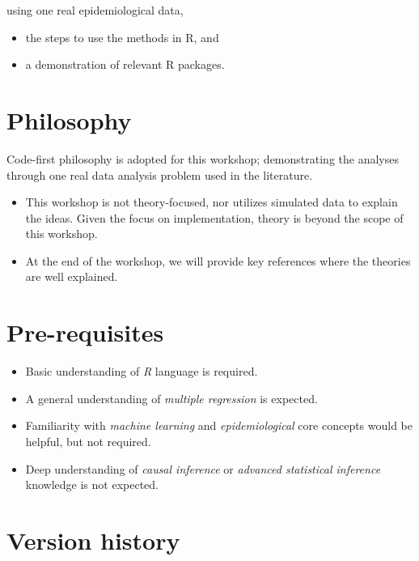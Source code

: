 \documentclass[
]{book}
\providecommand{\tightlist}{%
  \setlength{\itemsep}{0pt}\setlength{\parskip}{0pt}}
\begin{document}
using one real epidemiological data,

\begin{itemize}
\tightlist
\item
  the steps to use the methods in R, and
\item
  a demonstration of relevant R packages.~
\end{itemize}

\hypertarget{philosophy}{%
\section*{Philosophy}\label{philosophy}}

Code-first philosophy is adopted for this workshop; demonstrating the analyses through one real data analysis problem used in the literature.

\begin{itemize}
\tightlist
\item
  This workshop is not theory-focused, nor utilizes simulated data to explain the ideas. Given the focus on implementation, theory is beyond the scope of this workshop.
\item
  At the end of the workshop, we will provide key references where the theories are well explained.
\end{itemize}

\hypertarget{pre-requisites}{%
\section*{Pre-requisites}\label{pre-requisites}}

\begin{itemize}
\tightlist
\item
  Basic understanding of \emph{R} language is required.
\item
  A general understanding of \emph{multiple regression} is expected.
\item
  Familiarity with \emph{machine learning} and \emph{epidemiological} core concepts would be helpful, but not required.
\item
  Deep understanding of \emph{causal inference} or \emph{advanced statistical inference} knowledge is not expected.
\end{itemize}

\hypertarget{version-history}{%
\section*{Version history}\label{version-history}}
\end{document}
